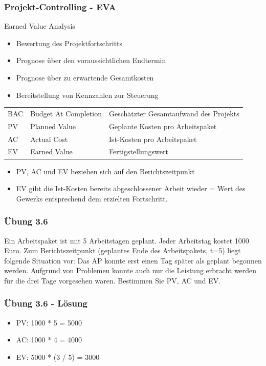 \begin{frame}
\frametitle{Projekt-Controlling - EVA}
Earned Value Analysis
	\begin{itemize}
		\item Bewertung des Projektfortschritts
		\item Prognose über den voraussichtlichen Endtermin
		\item Prognose über zu erwartende Gesamtkosten
		\item Bereitstellung von Kennzahlen zur Steuerung
	\end{itemize}
	\scriptsize
	\begin{table}[]
		\begin{tabular}{lll}
		 BAC & Budget At Completion & Geschätzter Gesamtaufwand des Projekts \\
		 PV & Planned Value & Geplante Kosten pro Arbeitspaket \\
		 AC & Actual Cost & Ist-Kosten pro Arbeitspaket \\
		 EV & Earned Value & Fertigstellungswert \\
		\end{tabular}
	\end{table}
	\normalsize
	\begin{itemize}
		\item PV, AC und EV beziehen sich auf den Berichtszeitpunkt
		\item EV gibt die Ist-Kosten bereits abgeschlossener Arbeit wieder
		      = Wert des Gewerks entsprechend dem erzielten Fortschritt.
	\end{itemize}
\end{frame}

\begin{frame}
\frametitle{Übung 3.6}
	Ein Arbeitspaket ist mit 5 Arbeitstagen geplant. Jeder Arbeitstag kostet 1000 Euro.
	Zum Berichtszeitpunkt (geplantes Ende des Arbeitspakets, t=5) liegt folgende Situation vor:
	Das AP konnte erst einen Tag später als geplant begonnen werden. Aufgrund von Problemen
	konnte auch nur die Leistung erbracht werden für die drei Tage vorgesehen waren. Bestimmen
	Sie PV, AC und EV.
\end{frame}

\ifloesung
\begin{frame}
\frametitle{Übung 3.6 - Lösung}
	\begin{itemize}
		\item PV: 1000 * 5 = 5000
		\item AC: 1000 * 4 = 4000
		\item EV: 5000 * (3 / 5) = 3000
	\end{itemize}
\end{frame}
\fi

